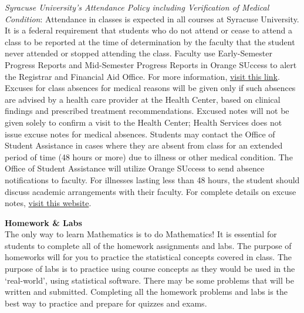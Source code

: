 \documentclass[11pt,letterpaper]{article}
\newcommand{\lefthead}[2]{\noindent\textbf{#1}\hfill\\[#2]}
\begin{document}
\noindent \emph{Syracuse University's Attendance Policy including Verification of Medical Condition}: Attendance in classes is expected in all courses at Syracuse University. It is a federal requirement that students who do not attend or cease to attend a class to be reported at the time of determination by the faculty that the student never attended or stopped attending the class. Faculty use Early-Semester Progress Reports and Mid-Semester Progress Reports in Orange SUccess to alert the Registrar and Financial Aid Office. For more information, \href{http://registrar.syr.edu/students/non-attendance/?_ga=2.260397263.311609789.1547331142-2140806708.1536285916}{visit this link}. Excuses for class absences for medical reasons will be given only if such absences are advised by a health care provider at the Health Center, based on clinical findings and prescribed treatment recommendations. Excused notes will not be given solely to confirm a visit to the Health Center; Health Services does not issue excuse notes for medical absences. Students may contact the Office of Student Assistance in cases where they are absent from class for an extended period of time (48 hours or more) due to illness or other medical condition. The Office of Student Assistance will utilize Orange SUccess to send absence notifications to faculty. For illnesses lasting less than 48 hours, the student should discuss academic arrangements with their faculty. For complete details on excuse notes, \href{http://studentassistance.syr.edu/our-services/absence-notifications.html?_ga=2.260397263.311609789.1547331142-2140806708.1536285916}{visit this website}. \\[0.3cm]





\newpage





\lefthead{Homework \& Labs}{0.3cm}
\noindent The only way to learn Mathematics is to do Mathematics! It is essential for students to complete all of the homework assignments and labs. The purpose of homeworks will for you to practice the statistical concepts covered in class. The purpose of labs is to practice using course concepts as they would be used in the `real-world', using statistical software. There may be  some problems that will be written and submitted. Completing all the homework problems and labs is the best way to practice and prepare for quizzes and exams. \\
\end{document}
